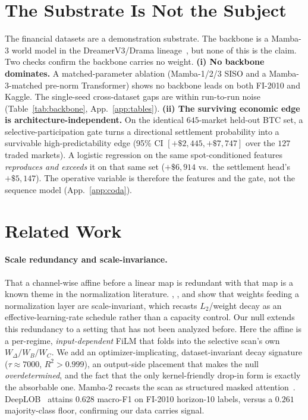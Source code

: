 \documentclass{article}
\begin{document}
\section{The Substrate Is Not the Subject}\label{sec:substrate}

The financial datasets are a demonstration substrate. The backbone is a Mamba-3
world model in the DreamerV3/Drama lineage~\citep{hafner2023dreamerv3, wang2024drama},
but none of this is the claim. Two checks confirm the backbone carries no weight.
\textbf{(i) No backbone dominates.} A matched-parameter ablation (Mamba-1/2/3 SISO
and a Mamba-3-matched pre-norm Transformer) shows no backbone leads on both
FI-2010 and Kaggle. The single-seed cross-dataset gaps are within run-to-run noise
(Table~\ref{tab:backbone}, App.~\ref{app:tables}). \textbf{(ii) The surviving economic edge is architecture-independent.} On the
identical $645$-market held-out BTC set, a selective-participation gate turns a
directional settlement probability into a survivable high-predictability edge (95\%
CI $[+\$2{,}445,+\$7{,}747]$ over the $127$ traded markets). A logistic regression
on the same spot-conditioned features \emph{reproduces and exceeds} it on that same
set ($+\$6{,}914$ vs.\ the settlement head's $+\$5{,}147$). The operative
variable is therefore the features and the gate, not the sequence model
(App.~\ref{app:coda}).

\section{Related Work}\label{sec:related}

\paragraph{Scale redundancy and scale-invariance.}
That a channel-wise affine before a linear map is redundant with that map is a
known theme in the normalization literature. \citet{vanlaarhoven2017l2},
\citet{hoffer2018norm}, and \citet{li2020exp} show that weights feeding a
normalization layer are scale-invariant, which recasts $L_2$/weight decay as an
effective-learning-rate schedule rather than a capacity control. Our null extends
this redundancy to a setting that has not been analyzed before. Here the affine is
a per-regime, \emph{input-dependent} FiLM that folds into the selective scan's own
$W_\Delta/W_B/W_C$. We add an optimizer-implicating, dataset-invariant decay
signature ($\tau\approx7000$, $R^2>0.999$), an output-side placement that makes
the null \emph{overdetermined}, and the fact that the only kernel-friendly
drop-in form is exactly the absorbable one. Mamba-2 recasts the scan as structured
masked attention~\citep{dao2024mamba2}. DeepLOB~\citep{zhang2019deeplob} attains
$0.628$ macro-F1 on FI-2010 horizon-10 labels, versus a $0.261$ majority-class
floor, confirming our data carries signal.
\end{document}
